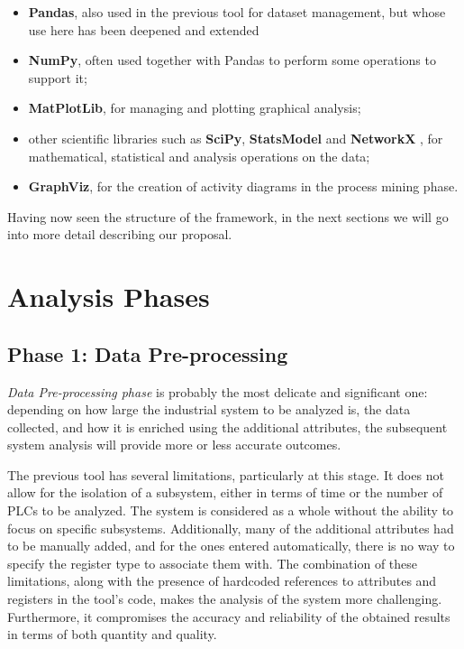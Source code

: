 \begin{itemize}
	\item \textbf{Pandas}, also used in the previous tool for dataset management, but whose use here has been deepened and extended	
	\item \textbf{NumPy}, often used together with Pandas to perform some operations to support it;
	
	\item \textbf{MatPlotLib}, for managing and plotting graphical analysis;
	
	\item other scientific libraries such as \textbf{SciPy}, \textbf{StatsModel} \cite{statsmodel} and \textbf{NetworkX} \cite{networkx}, for mathematical, statistical and analysis operations on the data;
	
	\item \textbf{GraphViz}, for the creation of activity diagrams in the process mining phase.
\end{itemize}
Having now seen the structure of the framework, in the next sections we will go into more detail describing our proposal.

\section{Analysis Phases}

\subsection{Phase 1: Data Pre-processing}
\label{subsec:improve_preprocessing}
\textit{Data Pre-processing phase} is probably the most delicate and significant one: depending on how large the industrial system to be analyzed is, the data collected, and how it is enriched using the additional attributes, the subsequent system analysis will provide more or less accurate outcomes.

\bigskip
The previous tool has several limitations, particularly at this stage. It does not allow for the isolation of a subsystem, either in terms of time or the number of PLCs to be analyzed. The system is considered as a whole without the ability to focus on specific subsystems. Additionally, many of the additional attributes had to be manually added, and for the ones entered automatically, there is no way to specify the register type to associate them with.\newline
The combination of these limitations, along with the presence of hardcoded references to attributes and registers in the tool's code, makes the analysis of the system more challenging. Furthermore, it compromises the accuracy and reliability of the obtained results in terms of both quantity and quality.

